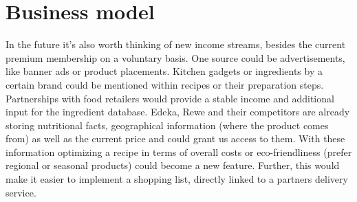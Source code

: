 \section*{Business model}
In the future it’s also worth thinking of new income streams, besides the current premium membership on a voluntary basis. One source could be advertisements, like banner ads or product placements. Kitchen gadgets or ingredients by a certain brand could be mentioned within recipes or their preparation steps. 
Partnerships with food retailers would provide a stable income and additional input for the ingredient database. Edeka, Rewe and their competitors are already storing nutritional facts, geographical information (where the product comes from) as well as the current price and could grant us access to them. With these information optimizing a recipe in terms of overall costs or eco-friendliness (prefer regional or seasonal products) could become a new feature. 
Further, this would make it easier to implement a shopping list, directly linked to a partners delivery service.
